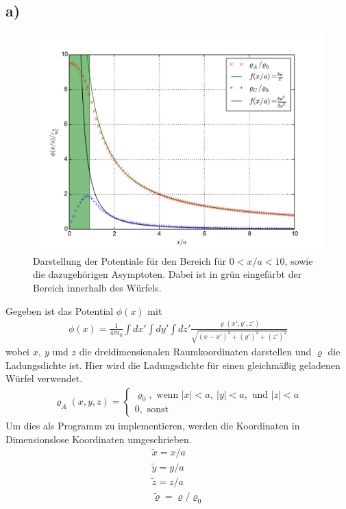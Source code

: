 \subsection*{a)}
\begin{figure}[h!]
	\centering
	\includegraphics[width = \textwidth]{../Plots/Plot.pdf}
	\caption{\label{fig:Potentiale}Darstellung der Potentiale für den Bereich für $0<x/a<10$, sowie die dazugehörigen Asymptoten. Dabei ist in grün eingefärbt der Bereich innerhalb des Würfels.}
\end{figure}
Gegeben ist das Potential $\phi(x)$ mit
\begin{align}
	\phi(x)=\frac{1}{4\pi \epsilon_0}\int dx'\int dy' \int dz' \frac{\varrho(x' , y' ,z')}{\sqrt{(x-x')^2+(y')^2+(z')^2}}
\end{align}
wobei $x,\ y$ und $z$ die dreidimensionalen Raumkoordinaten darstellen und $\varrho$ die Ladungsdichte ist.
Hier wird die Ladungsdichte für einen gleichmäßig geladenen Würfel verwendet.
\begin{align}
 \varrho_A(x ,y ,z) = 
 \begin{cases}
 	\varrho_0, \text{ wenn } |x|<a,\ |y|<a,\text{ und } |z|<a\\
 	0,\text{\ \ \ sonst}
 \end{cases}
\end{align}
Um dies als Programm zu implementieren, werden die Koordinaten in Dimensionslose Koordinaten umgeschrieben.
\begin{align*}
	\tilde{x}=x/a\\
	\tilde{y}=y/a\\
	\tilde{z}=z/a\\
	\tilde{\varrho} = \varrho/\varrho_0
\end{align*}
